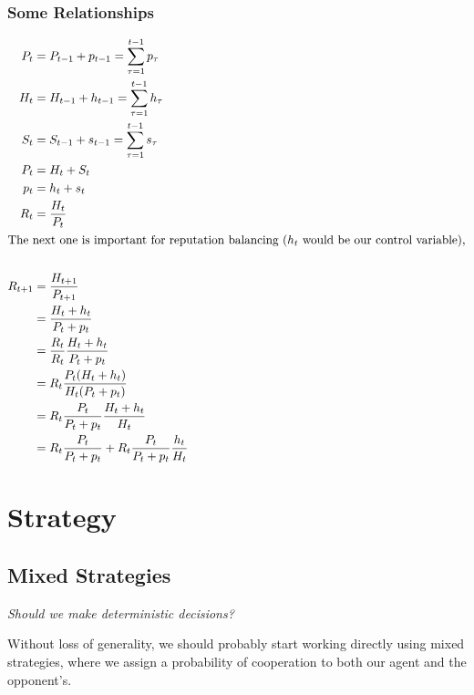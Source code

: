 \documentclass[10pt,fleqn]{article}
\begin{document}
\subsubsection{Some Relationships}
\begin{align*}
  P_t &= P_{t-1} + p_{t-1} = \sum_{\tau = 1}^{t-1} p_\tau \\
  H_t &= H_{t-1} + h_{t-1} = \sum_{\tau = 1}^{t-1} h_\tau \\
  S_t &= S_{t-1} + s_{t-1} = \sum_{\tau = 1}^{t-1} s_\tau \\
  P_t &= H_t + S_t \\
  p_t &= h_t + s_t \\
  R_t &= \frac{H_t}{P_t} \\
  \intertext{The next one is important for reputation balancing ($h_t$ would be
  our control variable),} \\
  R_{t+1} &= \frac{H_{t+1}}{P_{t+1}} \\
          &= \frac{H_t+h_t}{P_t+p_t} \\
          &= \frac{R_t}{R_t} \frac{H_t+h_t}{P_t+p_t} \\
          &= R_t \frac{P_t (H_t+h_t)}{H_t (P_t+p_t)} \\
          &= R_t \frac{P_t}{P_t + p_t} \frac{H_t + h_t}{H_t} \\
          &= R_t \frac{P_t}{P_t + p_t} + R_t \frac{P_t}{P_t + p_t} \frac{h_t}{H_t}
\end{align*}


\section{Strategy}

\subsection{Mixed Strategies}
\emph{Should we make deterministic decisions?}

Without loss of generality, we should probably start working directly using
mixed strategies, where we assign a probability of cooperation to both our agent
and the opponent's.

\end{document}
